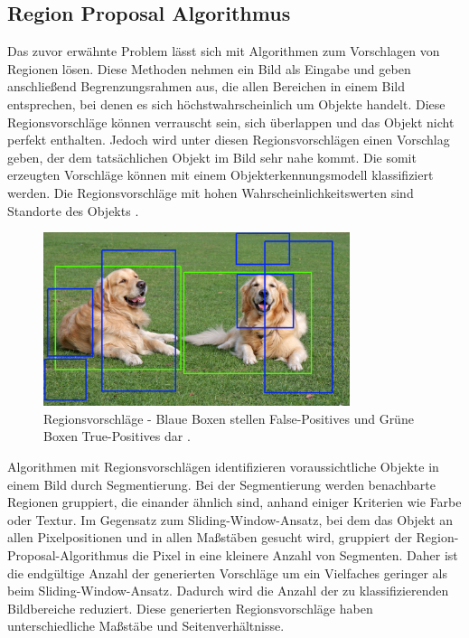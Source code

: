 \subsection{Region Proposal Algorithmus}

Das zuvor erwähnte Problem lässt sich mit Algorithmen zum Vorschlagen von Regionen lösen. Diese Methoden nehmen ein Bild als Eingabe und geben anschließend Begrenzungsrahmen aus, die allen Bereichen in einem Bild entsprechen, bei denen es sich höchstwahrscheinlich um Objekte handelt. Diese Regionsvorschläge können verrauscht sein, sich überlappen und das Objekt nicht perfekt enthalten. Jedoch wird unter diesen Regionsvorschlägen einen Vorschlag geben, der dem tatsächlichen Objekt im Bild sehr nahe kommt. Die somit erzeugten Vorschläge können mit einem Objekterkennungsmodell klassifiziert werden. Die Regionsvorschläge mit hohen Wahrscheinlichkeitswerten sind Standorte des Objekts \cite{learnopencv}.

\begin{figure}[htb]
	\centering
	\includegraphics[width=0.8\textwidth]{images/object-recognition-false-positives-true-positives}
	\caption[Darstellung des Region Proposal Algorithmus]{Regionsvorschläge - Blaue Boxen stellen False-Positives und Grüne Boxen True-Positives dar \cite{learnopencv}.}
\end{figure}

Algorithmen mit Regionsvorschlägen identifizieren voraussichtliche Objekte in einem Bild durch Segmentierung. Bei der Segmentierung werden benachbarte Regionen gruppiert, die einander ähnlich sind, anhand einiger Kriterien wie Farbe oder Textur. Im Gegensatz zum Sliding-Window-Ansatz, bei dem das Objekt an allen Pixelpositionen und in allen Maßstäben gesucht wird, gruppiert der Region-Proposal-Algorithmus die Pixel in eine kleinere Anzahl von Segmenten. Daher ist die endgültige Anzahl der generierten Vorschläge um ein Vielfaches geringer als beim Sliding-Window-Ansatz. Dadurch wird die Anzahl der zu klassifizierenden Bildbereiche reduziert. Diese generierten Regionsvorschläge haben unterschiedliche Maßstäbe und Seitenverhältnisse.

